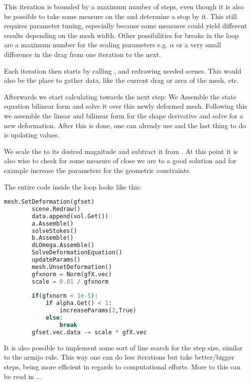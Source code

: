 This iteration is bounded by a maximum number of steps, even though it is also be possible to take some measure on the  and determine a stop by it.
This still requires parameter tuning, especially because some measures could yield different results depending on the mesh width.
Other possibilities for breaks in the loop are a maximum number for the scaling parameters e.g. $\alpha$ or a very small difference in the drag from one iteration to the next.

Each iteration then starts by calling , and redrawing needed scenes. This would also be the place to gather data, like the current drag or area of the mesh, etc.

Afterwards we start calculating towards the next step:
We Assemble the state equation bilinear form and solve it over this newly deformed mesh. Following this we assemble the linear and bilinear form for the shape derivative and solve for a new deformation. After this is done, one can already use  and the last thing to do is updating values.

We scale the  to its desired magnitude and subtract it from . At this point it is also wise to check for some measure of close we are to a good solution and for example increase the parameters for the geometric constraints.

The entire code inside the loop looks like this:

\begin{lstlisting}[language=Python, title=Iteration, label=lst:loop]
		mesh.SetDeformation(gfset)
		scene.Redraw()
		data.append(vol.Get())
		a.Assemble()
		solveStokes()
		b.Assemble()
		dLOmega.Assemble()
		SolveDeformationEquation()
		updateParams()
		mesh.UnsetDeformation()
		gfxnorm = Norm(gfX.vec)
		scale = 0.01 / gfxnorm
		
		if(gfxnorm < 1e-5):
			if alpha.Get() < 1:
				increaseParams(2,True)
			else:
				break
		gfset.vec.data -= scale * gfX.vec
\end{lstlisting}

It is also possible to implement some sort of line search for the step size, similar to the armijo rule. This way one can do less iterations but take better/bigger steps, being more efficient in regards to computational efforts. More to this can be read in ...
